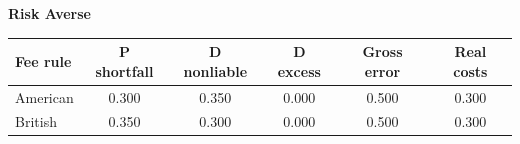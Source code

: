 \documentclass[10pt,border=5pt,varwidth=17cm]{standalone}
\begin{document}
\begingroup
\small
\setlength{\tabcolsep}{5pt}
\renewcommand{\arraystretch}{1.20}
\noindent\textbf{Risk Averse}\par\smallskip
\noindent\begin{tabularx}{\linewidth}{@{}>{\raggedright\arraybackslash}Xccccc@{}}
\toprule
\textbf{Fee rule} & \textbf{P shortfall} & \textbf{D nonliable} & \textbf{D excess} & \textbf{Gross error} & \textbf{Real costs} \\
\midrule
American & 0.300 & 0.350 & 0.000 & 0.500 & 0.300 \\
British & 0.350 & 0.300 & 0.000 & 0.500 & 0.300 \\
\bottomrule\end{tabularx}\par\medskip
\endgroup
\end{document}
